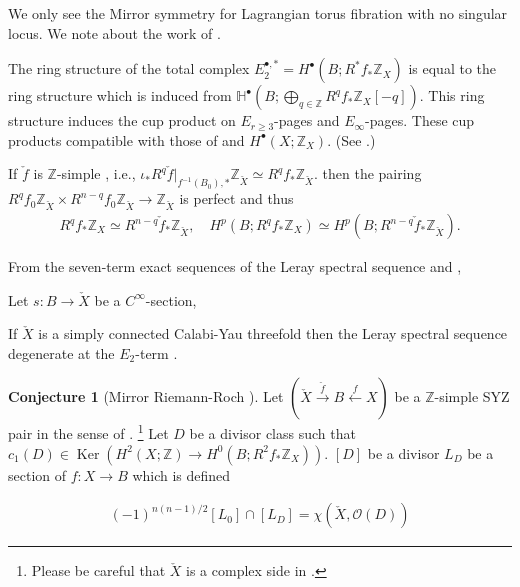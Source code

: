 \documentclass[a4paper,dvipdfmx,reqno,12pt]{amsart}
\theoremstyle{definition}
\newtheorem{Conj}[Thm]{Conjecture}
\newcommand{\Z}{\mathbb{Z}}%
\newcommand{\mb}[1]{\mathbb{#1}}%
\newcommand{\mcal}[1]{\mathcal{#1}}%
\newcommand{\opn}[1]{\operatorname{#1}}
\newcommand{\xto}[1]{\xrightarrow{#1}}
\newcommand{\xgets}[1]{\xleftarrow{#1}}
\numberwithin{equation}{section}
\begin{document}
We only see the Mirror symmetry for Lagrangian torus fibration
with no singular locus.
We note about the work of 
\cite{grossSpecialLagrangianFibrations1998a,grossSpecialLagrangianFibrations1999}.



The ring structure of the total complex $E_2^{\bullet,*}=H^{\bullet}(B;R^{*}f_*\Z_X)$
is equal to the ring structure which is induced from 
$\mb{H}^{\bullet}(B;\bigoplus_{q\in \Z}R^{q}f_*\Z_X[-q])$. This ring structure induces
the cup product on $E_{r\geq 3}$-pages and $E_{\infty}$-pages.
These cup products compatible with those of 
 and $H^{\bullet}(X;\Z_X)$. (See \cite[IV 6.8., Appendix A]{bredonSheafTheory1997a}.)

If $\check{f}$ is $\Z$-simple \cite[Definition 2.1]{grossSpecialLagrangianFibrations1998a} 
, i.e., $\iota_*R^{q}\check{f}|_{f^{-1}(B_0),*}\Z_{\check{X}}\simeq R^{q}f_*\Z_{\check{X}}$.
then the pairing $R^{q}f_0\Z_{\check{X}} \times R^{n-q}f_0\Z_{\check{X}}\to \Z_{\check{X}}$
is perfect and thus
\begin{align}
R^{q}f_*\Z_X\simeq R^{n-q}\check{f}_*\Z_{\check{X}},
\quad H^{p}(B;R^{q}f_*\Z_X)\simeq H^{p}(B;R^{n-q}\check{f}_*\Z_{\check{X}}).
\end{align}

From the seven-term exact sequences of the Leray spectral sequence and \cite[Remark ]{}, 

Let $s:B\to \check{X}$ be a $C^{\infty}$-section, 

If $\check{X}$ is a simply connected Calabi-Yau threefold then the Leray 
spectral sequence degenerate at the $E_2$-term \cite[Theorem 3.9]{}.

\begin{Conj}[{Mirror Riemann-Roch \cite[Conjecture 4.9]{grossSpecialLagrangianFibrations1998a}}]
Let $(\check{X} \xto{\check{f}} B \xgets{f} X)$ be a $\Z$-simple SYZ pair in the sense of 
\cite[Definition 2.1, 2.3]{grossSpecialLagrangianFibrations1998a}.
\footnote{Please be careful that $\check{X}$ is a complex side in 
\cite{grossSpecialLagrangianFibrations1998a}.}
Let $D$ be a divisor class such that
$c_1(D)\in\opn{Ker}(H^{2}(X;\Z)\to H^{0}(B;R^{2}f_*\Z_{X}))$.
$[D]$ be a divisor
$L_{D}$ be a section of $f:X\to B$ which is defined

\begin{align}
    (-1)^{n(n-1)/2}[L_0] \cap [L_D]=\chi(\check{X},\mcal{O}(D))
  \end{align}
\end{Conj}
\end{document}
